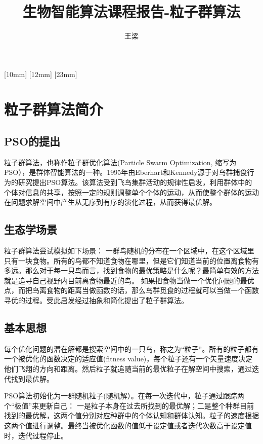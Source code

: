 \documentclass[8pt]{article}
\begin{document}
\let\nofiles\relax


[10mm]
{\fontsize{10pt}{14pt}\selectfont {}}
{\contentslabel{4em}}
{}
{\contentspage}
[12mm]
{\fontsize{10pt}{14pt}\selectfont {}}
{\contentslabel{2em}}
{}
{\contentspage}
[23mm]
{\fontsize{10pt}{14pt}\selectfont {}}
{\contentslabel{3em}}
{}
{\contentspage}

\title{生物智能算法课程报告-粒子群算法}
\author{王梁}
\date{}
\maketitle
\tableofcontents

\newpage
\section{粒子群算法简介}
\vspace{0.1cm}
\subsection{PSO的提出}
粒子群算法，也称作粒子群优化算法(Particle Swarm Optimization, 缩写为PSO），是群体智能算法的一种。1995年由Eberhart和Kennedy源于对鸟群捕食行为的研究提出PSO算法。该算法受到飞鸟集群活动的规律性启发，利用群体中的个体对信息的共享，按照一定的规则调整单个个体的运动，从而使整个群体的运动在问题求解空间中产生从无序到有序的演化过程，从而获得最优解。
\subsection{生态学场景}
粒子群算法尝试模拟如下场景：
一群鸟随机的分布在一个区域中，在这个区域里只有一块食物。所有的鸟都不知道食物在哪里，但是它们知道当前的位置离食物有多远。那么对于每一只鸟而言，找到食物的最优策略是什么呢？最简单有效的方法就是追寻自己视野内目前离食物最近的鸟。
如果把食物当做一个优化问题的最优点，而把鸟离食物的距离当做函数的话，那么鸟群觅食的过程就可以当做一个函数寻优的过程。受此启发经过抽象和简化提出了粒子群算法。
\subsection{基本思想}
每个优化问题的潜在解都是搜索空间中的一只鸟，称之为“粒子”。所有的粒子都有一个被优化的函数决定的适应值(fitness value)，每个粒子还有一个矢量速度决定他们飞翔的方向和距离。然后粒子就追随当前的最优粒子在解空间中搜索，通过迭代找到最优解。\par
PSO算法初始化为一群随机粒子(随机解）。在每一次迭代中，粒子通过跟踪两个“极值”来更新自己： 一是粒子本身在过去所找到的最优解；二是整个种群目前找到的最优解，这两个值分别对应种群中的个体认知和群体认知。粒子的速度根据这两个值进行调整。最终当被优化函数的值低于设定值或者迭代次数高于设定值时，迭代过程停止。
\end{document}
